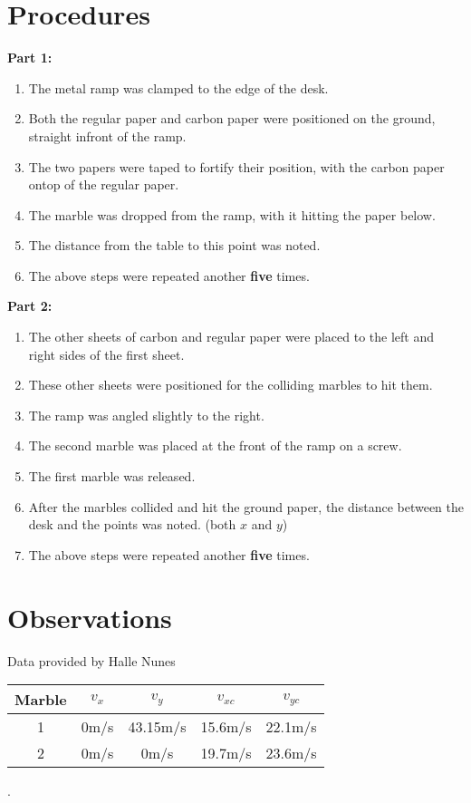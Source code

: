 \documentclass{article}
\begin{document}
\section*{Procedures}
\textbf{Part 1:}
\begin{enumerate}
    \item {The metal ramp was clamped to the edge of the desk.}
    \item {Both the regular paper and carbon paper were positioned on the ground, straight infront of the ramp.}
    \item {The two papers were taped to fortify their position, with the carbon paper ontop of the regular paper.}
    \item {The marble was dropped from the ramp, with it hitting the paper below.}
    \item {The distance from the table to this point was noted.}
    \item {The above steps were repeated another \textbf{five} times.}
\end{enumerate}\leavevmode\newline
\textbf{Part 2:}
\begin{enumerate}
    \item {The other sheets of carbon and regular paper were placed to the left and right sides of the first sheet.}
    \item {These other sheets were positioned for the colliding marbles to hit them.}
    \item {The ramp was angled slightly to the right.}
    \item {The second marble was placed at the front of the ramp on a screw.}
    \item {The first marble was released.}
    \item {After the marbles collided and hit the ground paper, the distance between the desk and the points was noted. (both $x$ and $y$)}
    \item {The above steps were repeated another \textbf{five} times.}
\end{enumerate}\leavevmode


\section*{Observations}
Data provided by Halle Nunes\newline\newline
\begin{tabular}{ |c|c|c|c|c| }
    \hline
    Marble & $v_{x}$ & $v_{y}$  & $v_{xc}$ & $v_{yc}$ \\
    \hline
    1      & 0m/s    & 43.15m/s & 15.6m/s  & 22.1m/s  \\
    \hline
    2      & 0m/s    & 0m/s     & 19.7m/s  & 23.6m/s  \\
    \hline
\end{tabular}.\newline\newline
\end{document}
